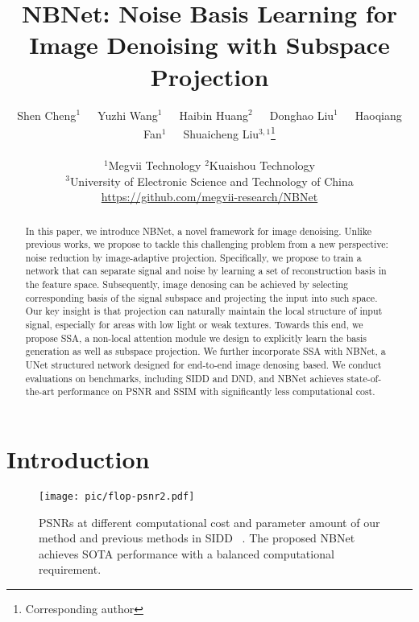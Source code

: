 \documentclass[final]{cvpr}
\begin{document}
\title{NBNet: Noise Basis Learning for Image Denoising with Subspace Projection}

\author{
    Shen Cheng$^{1}$\ \ \ Yuzhi Wang$^{1}$\ \ \ Haibin Huang$^{2}$\ \ \ Donghao Liu$^{1}$\ \ \ Haoqiang Fan$^{1}$\ \ \ Shuaicheng Liu$^{3,1}$\thanks {Corresponding author}
	\\
	\\
    $^{1}$Megvii Technology \quad  $^{2}$Kuaishou Technology \\
    $^{3}$University of Electronic Science and Technology of China \\
    \url{https://github.com/megvii-research/NBNet}
}





\maketitle
\thispagestyle{empty}
\begin{abstract}
   In this paper, we introduce NBNet, a novel framework for image denoising. Unlike previous works, we propose to tackle this challenging problem from a new perspective: noise reduction by image-adaptive projection. Specifically, we propose to train a network that can separate signal and noise by learning a set of reconstruction basis in the feature space. Subsequently, image denosing can be achieved by selecting corresponding basis of the signal subspace and projecting the input into such space. Our key insight is that projection can naturally maintain the local structure of input signal, especially for areas with low light or weak textures.  Towards this end,  we propose 
   SSA, a non-local attention module we design to explicitly learn the basis generation as well as subspace projection. We further incorporate SSA with NBNet, a UNet structured network designed for end-to-end image denosing based. We conduct evaluations on benchmarks, including SIDD and DND, and NBNet achieves state-of-the-art performance on PSNR and SSIM with significantly less computational cost.  
\end{abstract}

\section{Introduction}
\begin{figure}[t]
    \centering
    \texttt{[image: pic/flop-psnr2.pdf]}
    \caption{PSNRs at different computational cost and parameter amount of our method and previous methods in SIDD ~\cite{abdelhamed2018high}. The proposed NBNet achieves SOTA performance with a balanced computational requirement.}
    \label{fig:flop_psnr}
\end{figure}
\end{document}
